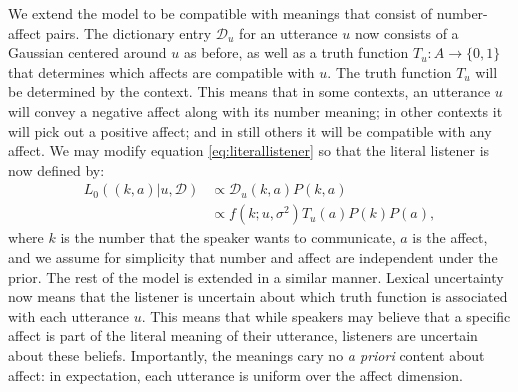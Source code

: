 \documentclass{article} %
\newcommand{\dictionary}{\ensuremath{\mathcal{D}}\xspace}
\begin{document}
We extend the model to be compatible with meanings that consist of number-affect pairs. The dictionary entry $\dictionary_u$ for an utterance $u$ now consists of a Gaussian centered around $u$ as before, as well as a truth function $T_u:A\rightarrow \{0,1\}$ that determines which affects are compatible with $u$. The truth function $T_u$ will be determined by the context. This means that in some contexts, an utterance $u$ will convey a negative affect along with its number meaning; in other contexts it will pick out a positive affect; and in still others it will be compatible with any affect. We may modify equation \ref{eq:literallistener} so that the literal listener is now defined by:
\begin{align}\label{eq:affectliteral}
L_0((k,a) | u, \dictionary) &\propto \dictionary_u(k,a)P(k,a) \\
&\propto f(k;u,\sigma^2)T_u(a)P(k)P(a),
\end{align}
where $k$ is the number that the speaker wants to communicate, $a$ is the affect, and we assume for simplicity that number and affect are independent under the prior. 
The rest of the model is extended in a similar manner. Lexical uncertainty now means that the listener is uncertain about which truth function is associated with each utterance $u$. This means that while speakers may believe that a specific affect is part of the literal meaning of their utterance, listeners are uncertain about these beliefs. Importantly, the meanings cary no \emph{a priori} content about affect: in expectation, each utterance is uniform over the affect dimension. 
\end{document}
